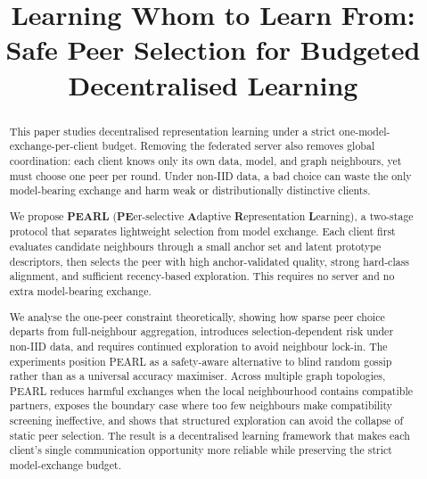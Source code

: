 \documentclass[conference]{IEEEtran}
\begin{document}
\title{Learning Whom to Learn From:\\
Safe Peer Selection for Budgeted Decentralised Learning}

\author{
}

\maketitle

\begin{abstract}
This paper studies decentralised representation learning under a strict one-model-exchange-per-client budget. Removing the federated server also removes global coordination: each client knows only its own data, model, and graph neighbours, yet must choose one peer per round. Under non-IID data, a bad choice can waste the only model-bearing exchange and harm weak or distributionally distinctive clients.

We propose \textbf{PEARL} (\textbf{PE}er-selective \textbf{A}daptive \textbf{R}epresentation \textbf{L}earning), a two-stage protocol that separates lightweight selection from model exchange. Each client first evaluates candidate neighbours through a small anchor set and latent prototype descriptors, then selects the peer with high anchor-validated quality, strong hard-class alignment, and sufficient recency-based exploration. This requires no server and no extra model-bearing exchange.

We analyse the one-peer constraint theoretically, showing how sparse peer choice departs from full-neighbour aggregation, introduces selection-dependent risk under non-IID data, and requires continued exploration to avoid neighbour lock-in. The experiments position PEARL as a safety-aware alternative to blind random gossip rather than as a universal accuracy maximiser. Across multiple graph topologies, PEARL reduces harmful exchanges when the local neighbourhood contains compatible partners, exposes the boundary case where too few neighbours make compatibility screening ineffective, and shows that structured exploration can avoid the collapse of static peer selection. The result is a decentralised learning framework that makes each client's single communication opportunity more reliable while preserving the strict model-exchange budget.
\end{abstract}
\end{document}
